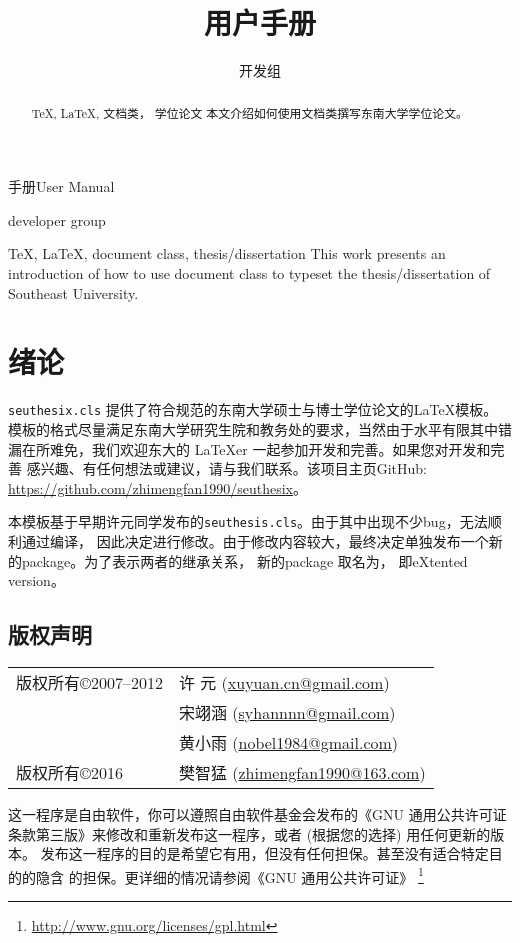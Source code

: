 \documentclass[figurelist,tablelist,algorithmlist,nomlist,masters]{seuthesix}
\begin{document}
\title{\seuthesix 用户手册}{手册}{\seuthesix User Manual}{\seuthesix}
\author{\seuthesix 开发组}{\seuthesix developer group}
\major{\TeX}
\submajor{\LaTeX}
\authorizedate{\today}
\makebigcover
\makecover
\begin{abstract}{\TeX, \LaTeX, 文档类， 学位论文}
本文介绍如何使用\seuthesix 文档类撰写东南大学学位论文。
\end{abstract}
\begin{englishabstract}{\TeX, \LaTeX, document class, thesis/dissertation}
This work presents an introduction of how to use \seuthesix document class to 
typeset the thesis/dissertation of Southeast University.
\end{englishabstract}

\tableofcontents
\listofothers

\mainmatter
\chapter{绪论}
\verb+seuthesix.cls+ 提供了符合规范的东南大学硕士与博士学位论文的\LaTeX 模板。
模板的格式尽量满足东南大学研究生院和教务处的要求，当然由于水平有限其中错
漏在所难免，我们欢迎东大的 \LaTeX{er} 一起参加开发和完善。如果您对开发和完善\seuthesix
感兴趣、有任何想法或建议，请与我们联系。该项目主页GitHub:
\url{https://github.com/zhimengfan1990/seuthesix}。

本模板基于早期许元同学发布的\verb+seuthesis.cls+。由于其中出现不少bug，无法顺利通过编译，
因此决定进行修改。由于修改内容较大，最终决定单独发布一个新的package。为了表示两者的继承关系，
新的package 取名为\seuthesix， 即\seuthesis{ }eXtented version。


\section{版权声明}
\begin{tabular}{ll}
版权所有\copyright 2007--2012 & 许 元 (\url{xuyuan.cn@gmail.com})\\
&宋翊涵 (\url{syhannnn@gmail.com})\\
& 黄小雨 (\url{nobel1984@gmail.com})\\
版权所有\copyright 2016 & 樊智猛 (\url{zhimengfan1990@163.com})
\end{tabular}
\par
这一程序是自由软件，你可以遵照自由软件基金会发布的《GNU 通用公共许可证
条款第三版》来修改和重新发布这一程序，或者 (根据您的选择) 用任何更新的版本。
发布这一程序的目的是希望它有用，但没有任何担保。甚至没有适合特定目的的隐含
的担保。更详细的情况请参阅《GNU 通用公共许可证》
\footnote{\url{http://www.gnu.org/licenses/gpl.html}}
\end{document}
